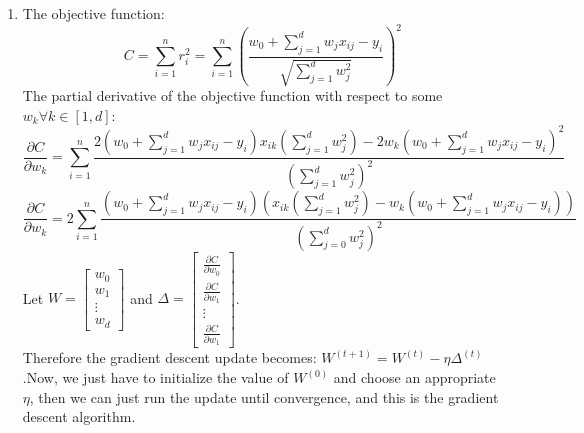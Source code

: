 \documentclass[twoside]{article}
\begin{document}
\begin{enumerate}
    \item
    The objective function:
    \begin{equation*}
        C = \sum_{i = 1}^n r_i^2 = \sum_{i = 1}^n \left( \frac{w_0 + \sum_{j = 1}^d w_j x_{ij} - y_i}{\sqrt{\sum_{j=1}^d w_j^2}} \right)^2
    \end{equation*}
    The partial derivative of the objective function with respect to some $w_k \forall k \in [1,d]$:
    \begin{equation*}
        \frac{\partial C}{\partial w_k} =  \sum_{i = 1}^n \frac{2(w_0 + \sum_{j=1}^d w_j x_{ij} -y_i)x_{ik}(\sum_{j=1}^d w_j^2) - 2w_k(w_0 + \sum_{j=1}^d w_j x_{ij} -y_i)^2}{(\sum_{j=1}^d w_j^2)^2}
    \end{equation*}
    \begin{equation*}
    	\frac{\partial C}{\partial w_k} =  2\sum_{i = 1}^n \frac{(w_0 + \sum_{j=1}^d w_j x_{ij} -y_i)\left(x_{ik}(\sum_{j=1}^d w_j^2) - w_k(w_0 + \sum_{j=1}^d w_j x_{ij} -y_i)\right)}{(\sum_{j=0}^d w_j^2)^2}
    \end{equation*}
    Let $W = \begin{bmatrix} w_0\\w_1\\ \vdots\\ w_d \end{bmatrix}$ and $\Delta = \begin{bmatrix} \frac{\partial C}{\partial w_0}\\\frac{\partial C}{\partial w_1}\\ \vdots\\ \frac{\partial C}{\partial w_1} \end{bmatrix}$.\\
    Therefore the gradient descent update becomes: $W^{(t+1)} = W^{(t)} - \eta \Delta ^ {(t)}$.Now, we just have to initialize the value of $W^{(0)}$ and choose an appropriate $\eta$, then we can just run the update until convergence, and this is the gradient descent algorithm.
    
    
\end{enumerate}
\end{document}
